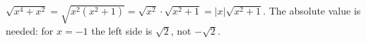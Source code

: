 $\sqrt{x^4+x^2}=\sqrt{x^2\left(x^2+1\right)}=\sqrt{x^2}\cdot\sqrt{x^2+1}=\boxed{|x|\sqrt{x^2+1}}$. The absolute value is needed: for $x=-1$ the left side is $\sqrt2$, not $-\sqrt2$.
